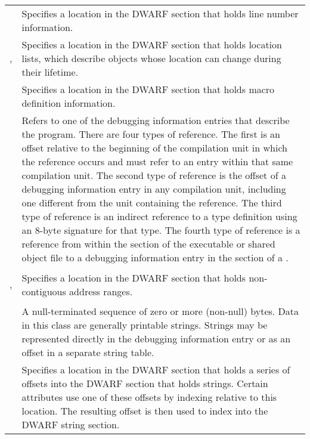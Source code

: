 \begin{longtable}{l|P{11cm}}
\hypertarget{chap:classlineptr}{}
&Specifies a location in the DWARF section that holds line 
number information.
\\

\hypertarget{chap:classloclist}{}
, 
\hypertarget{chap:classloclistsptr}{}
&Specifies a location in the DWARF section that holds location 
lists, which describe objects whose location can change during 
their lifetime.
\\

\hypertarget{chap:classmacptr}{}
&Specifies 
a location in the DWARF section that holds macro definition
information.
\\

\hypertarget{chap:classreference}{}
&Refers to one of the debugging information
entries that \mbox{describe} the program.  There are four types of
\mbox{reference}. The first is an offset relative to the beginning
of the \mbox{compilation} unit in which the reference occurs and must
refer to an entry within that same compilation unit. The second
type of reference is the offset of a debugging \mbox{information}
entry in any compilation unit, including one different from
the unit containing the reference. The third type of reference
is an indirect reference to a 
type definition using an 8-byte signature 
for that type. The fourth type of reference is a reference from within the 
\dotdebuginfo{} section of the executable or shared object file to
a debugging information entry in the \dotdebuginfo{} section of 
a .
\\

\hypertarget{chap:classrnglist}{}
, 
\hypertarget{chap:classrnglistsptr}{}
&Specifies a location in the DWARF section that holds 
non-contiguous address ranges.
\\

\hypertarget{chap:classstring}{}
& A null-terminated sequence of zero or more
(non-null) bytes. Data in this class are generally
printable strings. Strings may be represented directly in
the debugging \mbox{information} entry or as an offset in a separate
string table.
\\

\hypertarget{chap:classstroffsetsptr}{}
&Specifies a location in the DWARF section that holds
a series of offsets into the DWARF section that holds strings.
Certain attributes use one of these offsets by indexing 
relative to this location. The resulting offset is then 
used to index into the DWARF string section.
\\

\hline
\end{longtable}


